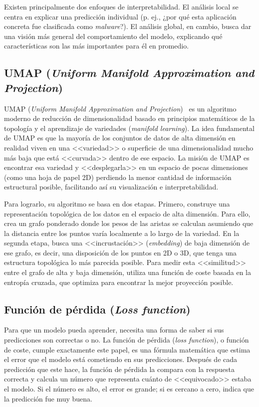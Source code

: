 Existen principalmente dos enfoques de interpretabilidad. El análisis local se centra en explicar una predicción individual (p. ej., ¿por qué esta aplicación concreta fue clasificada como \textit{malware}?). El análisis global, en cambio, busca dar una visión más general del comportamiento del modelo, explicando qué características son las más importantes para él en promedio.

\subsection{UMAP (\textit{Uniform Manifold Approximation and Projection})}

UMAP (\textit{Uniform Manifold Approximation and Projection})~\cite{mcinnes2018umap} es un algoritmo moderno de reducción de dimensionalidad basado en principios matemáticos de la topología y el aprendizaje de variedades (\textit{manifold learning}). La idea fundamental de UMAP es que la mayoría de los conjuntos de datos de alta dimensión en realidad viven en una <<variedad>> o superficie de una dimensionalidad mucho más baja que está <<curvada>> dentro de ese espacio. La misión de UMAP es encontrar esa variedad y <<desplegarla>> en un espacio de pocas dimensiones (como una hoja de papel 2D) perdiendo la menor cantidad de información estructural posible, facilitando así su visualización e interpretabilidad.

Para lograrlo, su algoritmo se basa en dos etapas. Primero, construye una representación topológica de los datos en el espacio de alta dimensión. Para ello, crea un grafo ponderado donde los pesos de las aristas se calculan asumiendo que la distancia entre los puntos varía localmente a lo largo de la variedad. En la segunda etapa, busca una <<incrustación>> (\textit{embedding}) de baja dimensión de ese grafo, es decir, una disposición de los puntos en 2D o 3D, que tenga una estructura topológica lo más parecida posible. Para medir esta <<similitud>> entre el grafo de alta y baja dimensión, utiliza una función de coste basada en la entropía cruzada, que optimiza para encontrar la mejor proyección posible.

\subsection{Función de pérdida (\textit{Loss function})}

Para que un modelo pueda aprender, necesita una forma de saber si sus predicciones son correctas o no. La función de pérdida (\textit{loss function}), o función de coste, cumple exactamente este papel, es una fórmula matemática que estima el error que el modelo está cometiendo en sus predicciones. Después de cada predicción que este hace, la función de pérdida la compara con la respuesta correcta y calcula un número que representa cuánto de <<equivocado>> estaba el modelo. Si el número es alto, el error es grande; si es cercano a cero, indica que la predicción fue muy buena.

